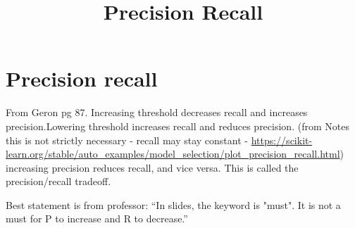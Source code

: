 \documentclass{article}
\begin{document}
\title{Precision Recall}
\section{Precision recall}
From Geron pg 87. Increasing threshold decreases recall and increases precision.Lowering threshold increases recall and reduces precision. (from Notes this is not strictly necessary - recall may stay constant - \url{https://scikit-learn.org/stable/auto_examples/model_selection/plot_precision_recall.html})\\

increasing precision reduces recall, and vice versa. This is called the precision/recall tradeoff.

Best statement is from professor: ``In slides, the keyword is "must". It is not a must for P to increase and R to decrease.''
\end{document}
